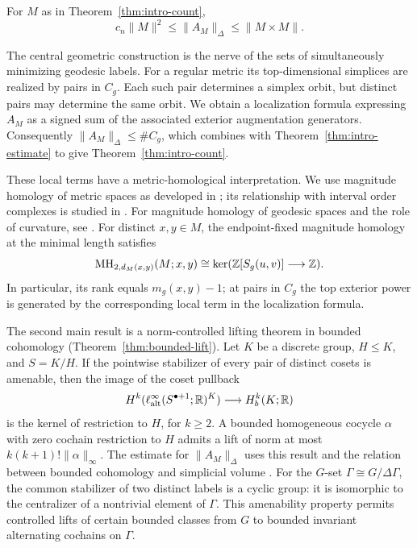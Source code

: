 \begin{theorem}\label{thm:intro-estimate}
For $M$ as in Theorem~\ref{thm:intro-count},
\[
 c_n\|M\|^2\leq\|A_M\|_\Delta\leq\|M\times M\|.
\]
\end{theorem}

The central geometric construction is the nerve of the sets of
simultaneously minimizing geodesic labels. For a regular metric its
top-dimensional simplices are realized by pairs in $C_g$.
Each such pair determines a simplex orbit, but distinct pairs
may determine the same orbit.
We obtain a localization formula expressing $A_M$ as a signed sum
of the associated exterior augmentation generators. Consequently
$\|A_M\|_\Delta\leq\#C_g$, which combines with
Theorem~\ref{thm:intro-estimate} to give
Theorem~\ref{thm:intro-count}.

These local terms have a metric-homological interpretation.
We use magnitude homology of metric spaces as developed in
\cite{LeinsterShulman2021}; its relationship with interval
order complexes is studied in \cite{KanetaYoshinaga2021}. For magnitude homology
of geodesic spaces and the role of curvature, see
\cite{Gomi2026,Asao2021}.
For distinct $x,y\in M$, the endpoint-fixed magnitude homology
at the minimal length satisfies
\[
 \mathrm{MH}_{2,d_M(x,y)}(M;x,y)\cong
 \ker(\mathbb{Z}[S_g(u,v)]\longrightarrow\mathbb{Z}).
\]
In particular, its rank equals $m_g(x,y)-1$; at pairs in $C_g$
the top exterior power is generated by the corresponding local
term in the localization formula.

The second main result is a norm-controlled lifting theorem in
bounded cohomology (Theorem~\ref{thm:bounded-lift}).
Let $K$ be a discrete group, $H\leq K$, and $S=K/H$.
If the pointwise stabilizer of every pair of distinct cosets is
amenable, then the image of the coset pullback
\[
 H^k(\ell^\infty_{\mathrm{alt}}(S^{\bullet+1};\mathbb{R})^K)
 \longrightarrow H_b^k(K;\mathbb{R})
\]
is the kernel of restriction to $H$, for $k\geq2$.
A bounded homogeneous cocycle $\alpha$ with zero cochain
restriction to $H$ admits a lift of norm at most
$k(k+1)!\|\alpha\|_\infty$.
The estimate for $\|A_M\|_\Delta$ uses this result and the
relation between bounded cohomology and simplicial volume
\cite{Gromov1982}.
For the $G$-set $\Gamma\cong G/\Delta\Gamma$, the common stabilizer
of two distinct labels is a cyclic group: it is isomorphic to the
centralizer of a nontrivial element of $\Gamma$. This amenability
property permits controlled lifts of certain bounded classes
from $G$ to bounded invariant alternating cochains on $\Gamma$.

